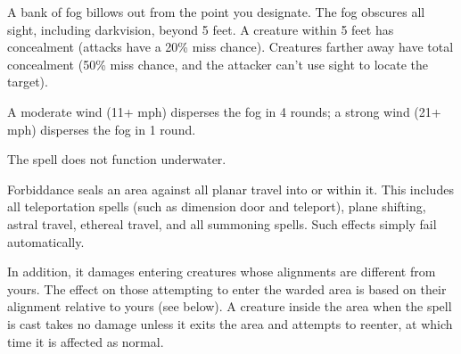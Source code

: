 \begin{multicols}{2}
\begin{small}

\noindent A bank of fog billows out from the point you designate. The fog obscures all sight, including darkvision, beyond 5 feet. A creature within 5 feet has concealment (attacks have a 20\% miss chance). Creatures farther away have total concealment (50\% miss chance, and the attacker can't use sight to locate the target).

\smallskip\noindent A moderate wind (11+ mph) disperses the fog in 4 rounds; a strong wind (21+ mph) disperses the fog in 1 round.

\smallskip\noindent The spell does not function underwater.

\noindent Forbiddance seals an area against all planar travel into or within it. This includes all teleportation spells (such as dimension door and teleport), plane shifting, astral travel, ethereal travel, and all summoning spells. Such effects simply fail automatically.

\smallskip\noindent In addition, it damages entering creatures whose alignments are different from yours. The effect on those attempting to enter the warded area is based on their alignment relative to yours (see below). A creature inside the area when the spell is cast takes no damage unless it exits the area and attempts to reenter, at which time it is affected as normal.



\end{small}
\end{multicols}
